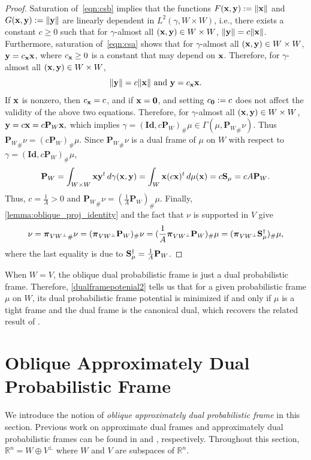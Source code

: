 \documentclass{amsart}
\numberwithin{equation}{section}
\newcommand{\bP}{{\mathbf P}}
\newcommand{\bpi}{{\boldsymbol{\pi}}}
\theoremstyle{plain}
\theoremstyle{remark}
\theoremstyle{definition}
\begin{document}
\begin{proof}
Saturation of~\eqref{eqn:csb} implies that the functions $
F({\bf x,y}) := \|{\bf x}\|$ and $ 
G({\bf x,y}) := \|{\bf y}\| $
are linearly dependent in $L^2(\gamma, W \times W)$, i.e.,  there exists a constant $c \geq 0$ such that for $\gamma$-almost all $ ({\bf x,y}) \in W \times W$, $\|{\bf y}\| = c \|{\bf x}\|$. 
Furthermore, saturation of~\eqref{eqn:csa} shows that for $\gamma$-almost all $({\bf x,y}) \in W \times W$, ${\bf y} = c_{\bf x} {\bf x}$,
where $c_{\bf x} \geq 0$ is a constant that may depend on  ${\bf x}$. Therefore, for $\gamma$-almost all $ ({\bf x,y}) \in W \times W$, 
$$\|{\bf y}\| = c \|{\bf x}\| \ \text{and} \  {\bf y} = c_{\bf x}{\bf x}.$$ 
If $\bf x$ is nonzero, then $c_{\bf x}=c$, and if $\bf x =0$, and setting $c_{\bf 0} :=c$ does not affect the validity of the above two equations. Therefore, for $\gamma$-almost all $ ({\bf x,y}) \in W \times W$, ${\bf y} = c {\bf x} = c\bP_W {\bf x},$
which implies $\gamma = (\mathbf{Id}, c\bP_W)_\# \mu \in \Gamma(\mu, {\bP_W}_\# \nu)$. Thus ${\bP_W}_\# \nu = (c\bP_W)_\# \mu$. Since  ${\bP_W}_\#\nu$ is a dual frame of $\mu$ on $W$ with respect to $\gamma = (\mathbf{Id}, c\bP_W)_\# \mu$, 
$$
\bP_W = \int_{W \times W} {\bf x}{\bf y}^t \, d\gamma({\bf x,y})
= \int_{W} {\bf x} (c{\bf x})^t \, d\mu({\bf x})
= c {\bf S}_\mu = c A \bP_W.
$$
Thus, $c = \frac{1}{A}>0$ and ${\bP_W}_\# \nu = \left(\tfrac{1}{A} \bP_W \right)_\# \mu$.
Finally, \cref{lemma:oblique_proj_identity} and the fact that $\nu$ is supported in $V$ give
$$\nu ={\bpi_{VW^\perp}}_\#\nu = ({\bpi_{VW^\perp}\bP_W})_\#\nu = ({\frac{1}{A}\bpi_{VW^\perp}\bP_W})_\#\mu = ({\bpi_{VW^\perp}{\bf S}^{\dagger}_\mu})_\# \mu,$$ 
where the last equality is due to ${\bf S}^\dagger_\mu =\frac{1}{A}\bP_W$.
\end{proof}

When $W=V$, the oblique dual probabilistic frame is just a dual probabilistic frame. Therefore, \cref{dualframepotenial2} tells us that for a given probabilistic frame $\mu$ on $W$, its dual probabilistic frame potential is minimized if and only if $\mu$ is a tight frame and the dual frame is the canonical dual, which recovers the related result of \cite[Theorem 3.7]{chen2025probabilistic}. 



\section{Oblique Approximately Dual Probabilistic Frame}\label{section:approximateDual}
We introduce the notion of \emph{oblique approximately dual probabilistic frame} in this section. Previous work on approximate dual frames and approximately dual probabilistic frames can be found in \cite{christensen2010approximately} and \cite{chen2025redundancy}, respectively. Throughout this section, $\mathbb{R}^n = W \oplus V^\perp$ where $W$ and $V$ are subspaces of $\mathbb{R}^n$. 
\end{document}
